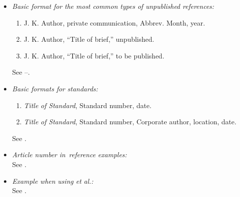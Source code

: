 \documentclass{IEEEtran}
\begin{document}
\begin{itemize}
\item \emph{Basic format for the most common types of unpublished references:}
\begin{enumerate}
\item J. K. Author, private communication, Abbrev. Month, year.
\item J. K. Author, ``Title of brief,'' unpublished.
\item J. K. Author, ``Title of brief,'' to be published.
\end{enumerate}
See \cite{b27}--\cite{b29}.

\item \emph{Basic formats for standards:}
\begin{enumerate}
\item \emph{Title of Standard}, Standard number, date.
\item \emph{Title of Standard}, Standard number, Corporate author, location, date.
\end{enumerate}
See \cite{b30,b31}.

\item \emph{Article number in~reference examples:}\\
See \cite{b32,b33}.

\item \emph{Example when using et al.:}\\
See \cite{b34}.

\end{itemize}
\end{document}
